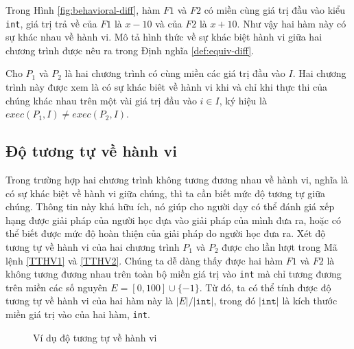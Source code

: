 Trong Hình \ref{fig:behavioral-diff}, hàm $F1$ và $F2$ có miền
cùng giá trị đầu vào kiểu \texttt{int}, giá trị trả về của $F1$ là
$x - 10$ và của $F2$ là $x + 10$. Như vậy hai hàm này có sự khác
nhau về hành vi. Mô tả hình thức về sự khác biệt hành vi giữa hai chương trình được nêu ra trong Định nghĩa \ref{def:equiv-diff}.

\begin{definition}
  \label{def:equiv-diff}
  Cho $P_{1}$ và $P_{2}$ là hai chương trình có cùng miền các giá trị
  đầu vào $I$. Hai chương trình này được xem là có sự khác biêt về
  hành vi khi và chỉ khi thực thi của chúng khác nhau trên một vài giá
  trị đầu vào $i \in I$, ký hiệu là
  $exec(P_{1}, I) \neq exec(P_{2}, I)$.
\end{definition}

\subsection{Độ tương tự về hành vi}

Trong trường hợp hai chương trình không tương đương nhau về hành vi,
nghĩa là có sự khác biệt về hành vi giữa chúng, thì ta cần biết mức độ
tương tự giữa chúng. Thông tin này khá hữu ích, nó giúp cho người dạy
có thể đánh giá xếp hạng được giải pháp của người học dựa vào giải
pháp của mình đưa ra, hoặc có thể biết được mức độ hoàn thiện của giải
pháp do người học đưa ra. Xét độ tương tự về hành vi của hai chương
trình $P_{1}$ và $P_{2}$ được cho lần lượt trong Mã lệnh \ref{TTHV1} và
\ref{TTHV2}. Chúng ta dễ dàng thấy được hai hàm $F1$ và $F2$ là
không tương đương nhau trên toàn bộ miền giá trị vào \texttt{int} mà chỉ tương đương trên miền các số nguyên $E = [0,100] \cup \{-1\}$. Từ đó, ta có thể tính được độ tương tự về hành vi của hai hàm này là $|E| / |\texttt{int}|$, trong đó $|\mathtt{int}|$ là kích thước miền giá trị vào của hai hàm, \texttt{int}.

\begin{figure}[H]
	\centering
	\caption{Ví dụ độ tương tự về hành vi}
	\label{fig:behavioral-sim}
	\begin{minipage}[t]{0.45\linewidth}
	  
	\end{minipage}%
	\hfill\vrule\hfill
	\begin{minipage}[t]{0.45\linewidth}
	  
	\end{minipage}%
\end{figure}

